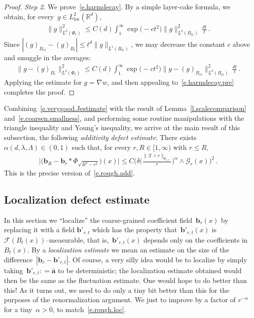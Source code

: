 \documentclass[11pt]{article} %
\numberwithin{equation}{section}
\theoremstyle{definition}
\newcommand*{\R}{\ensuremath{\mathbb{R}}}
\renewcommand{\b}{\ensuremath{\mathbf{b}}}
\renewcommand{\a}{\mathbf{a}}
\newcommand{\ahom}{\bar{\a}}
\newcommand{\X}{\mathcal{X}}
\begin{document}
\begin{proof}
\emph{Step 2.} We prove~\eqref{e.harmdecay}. By a simple layer-cake formula, we obtain, for every~$g \in L_{\mathrm{loc}}^2(\R^d)$,
\begin{align*}  
\| g \|_{L^2(\Phi_r)}^2 \leq C(d) \int_{1}^\infty \exp\bigl(-c t^2 \bigr) \| g \|_{\underline{L}^2(B_{tr})}^2 \,\frac{dt}{t}  \,.
\end{align*}
Since $| (g)_{B_{r t}} - (g)_{B_t} | \leq  t^d \| g \|_{\underline{L}^1(B_{tr})}$, we may decrease the constant $c$ above and smuggle in the averages:
\begin{align*}  
\| g  -(g)_{B_{r}}  \|_{L^2(\Phi_r)}^2 
\leq 
C(d) \int_{1}^\infty \exp\bigl(-ct^2\bigr) \| g - (g)_{B_{r t}} \|_{\underline{L}^2(B_{tr})}^2 \,\frac{dt}{t}  \,.
\end{align*}
Applying the estimate for $g = \nabla w$, and then appealing to~\eqref{e.harmdecay.pre} completes the proof.
\end{proof}




Combining~\eqref{e.verygood.Jestimate} with the result of Lemma~\ref{l.scalecomparison} and~\eqref{e.coarsen.smallness}, and performing some routine manipulations with the triangle inequality and Young's inequality, we arrive at the main result of this subsection, the following \emph{additivity defect estimate}: There exists $\alpha(d,\lambda,\Lambda) \in (0,1)$ such that, for every $r,R \in [1,\infty)$ with $r \leq R$, 
\begin{align}
\label{e.additivityestimate}
\big|
\bigl( \b_R - \b_r \ast \Phi_{\sqrt{R^2-r^2}} \bigr) (x) 
\big|
\leq
C \biggl( \delta \biggl(\frac{\| \X \wedge r  \|_{\Phi_{x,r}} }{r} \biggr)^\alpha \wedge \mathcal{G}_r(x) \biggr)^2
\,.
\end{align}
This is the precise version of~\eqref{e.rough.add}.

\subsection{Localization defect estimate}
\label{ss.local}

In this section we ``localize'' the coarse-grained coefficient field~$\b_r(x)$ by replacing it with a field $\b'_{r,t}$ which has the property that~$\b'_{r,t}(x)$ is $\mathcal{F}(B_t(x))$--measurable, that is,~$\b'_{r,t}(x)$ depends only on the coefficients in~$B_t(x)$. By a \emph{localization estimate} we mean an estimate on the size of the difference~$|\b_r - \b'_{r,t}|$. Of course, a very silly idea would be to localize by simply taking~$\b'_{r,t} : = \ahom$ to be deterministic; the localization estimate obtained would then be the same as the fluctuation estimate. One would hope to do better than this! As it turns out, we  need to do only a tiny bit better than this for the purposes of the renormalization argument. We just to improve by a factor of $r^{-\alpha}$ for a tiny~$\alpha>0$, to match~\eqref{e.rough.loc}. 
\end{document}
